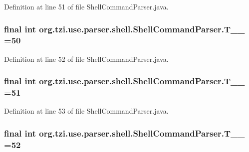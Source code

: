 Definition at line 51 of file Shell\-Command\-Parser.\-java.

\hypertarget{classorg_1_1tzi_1_1use_1_1parser_1_1shell_1_1_shell_command_parser_afe0d72c3ce2dd83f53fcaab3ec31e126}{
\subsubsection[{T\-\_\-\-\_\-50}]{\setlength{\rightskip}{0pt plus 5cm}final int org.\-tzi.\-use.\-parser.\-shell.\-Shell\-Command\-Parser.\-T\-\_\-\-\_ =50\hspace{0.3cm}{\ttfamily [static]}}}\label{classorg_1_1tzi_1_1use_1_1parser_1_1shell_1_1_shell_command_parser_afe0d72c3ce2dd83f53fcaab3ec31e126}


Definition at line 52 of file Shell\-Command\-Parser.\-java.

\hypertarget{classorg_1_1tzi_1_1use_1_1parser_1_1shell_1_1_shell_command_parser_a09a1d31138194fca6832712699356799}{
\subsubsection[{T\-\_\-\-\_\-51}]{\setlength{\rightskip}{0pt plus 5cm}final int org.\-tzi.\-use.\-parser.\-shell.\-Shell\-Command\-Parser.\-T\-\_\-\-\_ =51\hspace{0.3cm}{\ttfamily [static]}}}\label{classorg_1_1tzi_1_1use_1_1parser_1_1shell_1_1_shell_command_parser_a09a1d31138194fca6832712699356799}


Definition at line 53 of file Shell\-Command\-Parser.\-java.

\hypertarget{classorg_1_1tzi_1_1use_1_1parser_1_1shell_1_1_shell_command_parser_aacd6714a81147444041dc10152d30425}{
\subsubsection[{T\-\_\-\-\_\-52}]{\setlength{\rightskip}{0pt plus 5cm}final int org.\-tzi.\-use.\-parser.\-shell.\-Shell\-Command\-Parser.\-T\-\_\-\-\_ =52\hspace{0.3cm}{\ttfamily [static]}}}\label{classorg_1_1tzi_1_1use_1_1parser_1_1shell_1_1_shell_command_parser_aacd6714a81147444041dc10152d30425}


